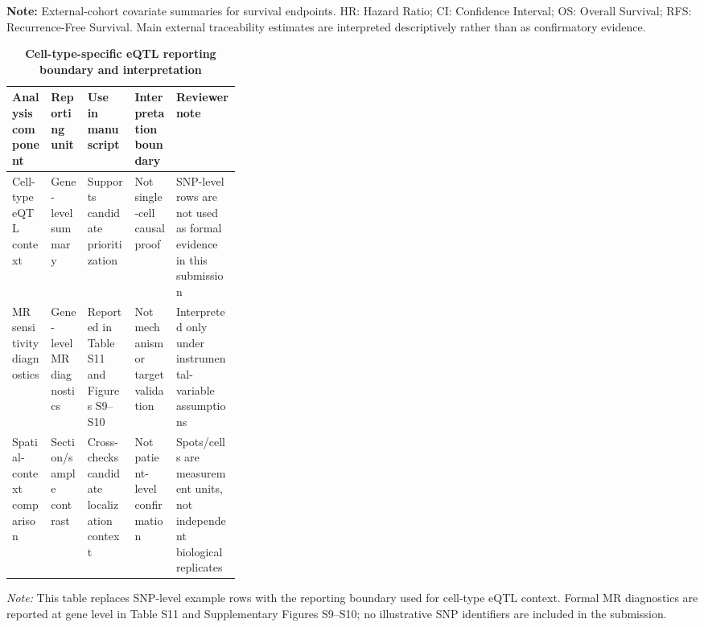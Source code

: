 \documentclass[a4paper,12pt]{article}
\begin{document}
\vspace{1em}
\noindent\small \textbf{Note:} External-cohort covariate summaries for survival endpoints. HR: Hazard Ratio; CI: Confidence Interval; OS: Overall Survival; RFS: Recurrence-Free Survival. Main external traceability estimates are interpreted descriptively rather than as confirmatory evidence.

\newpage
\begin{landscape}
{\small
  \begin{table}[H]
    \caption{\textbf{Cell-type-specific eQTL reporting boundary and interpretation}} \label{tab:Table_S10}
    \setlength{\tabcolsep}{4pt}
    \begin{tabularx}{\linewidth}{>{\raggedright\arraybackslash}p{0.17\linewidth}>{\raggedright\arraybackslash}p{0.16\linewidth}>{\raggedright\arraybackslash}X>{\raggedright\arraybackslash}X>{\raggedright\arraybackslash}X}
      \toprule
      Analysis component & Reporting unit & Use in manuscript & Interpretation boundary & Reviewer note \\
      \midrule
      Cell-type eQTL context & Gene-level summary & Supports candidate prioritization & Not single-cell causal proof & SNP-level rows are not used as formal evidence in this submission \\
      MR sensitivity diagnostics & Gene-level MR diagnostics & Reported in Table S11 and Figures S9--S10 & Not mechanism or target validation & Interpreted only under instrumental-variable assumptions \\
      Spatial-context comparison & Section/sample contrast & Cross-checks candidate localization context & Not patient-level confirmation & Spots/cells are measurement units, not independent biological replicates \\
      \bottomrule
    \end{tabularx}
  \end{table}
}
\end{landscape}

\vspace{1em}
\noindent\small \textit{Note:} This table replaces SNP-level example rows with the reporting boundary used for cell-type eQTL context. Formal MR diagnostics are reported at gene level in Table S11 and Supplementary Figures S9--S10; no illustrative SNP identifiers are included in the submission.
\end{document}
